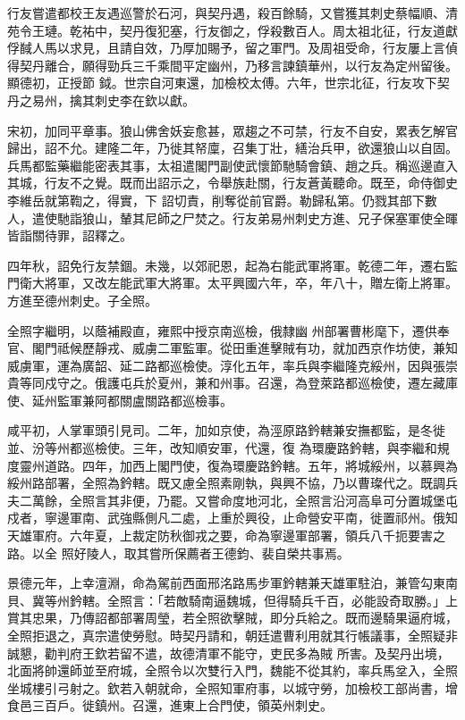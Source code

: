 \begin{pinyinscope}
 行友嘗遣都校王友遇巡警於石河，與契丹遇，殺百餘騎，又嘗獲其刺史蔡幅順、清苑令王璉。乾祐中，契丹復犯塞，行友御之，俘殺數百人。周太祖北征，行友道獻俘馘人馬以求見，且請自效，乃厚加賜予，留之軍門。及周祖受命，行友屢上言偵得契丹離合，願得勁兵三千乘間平定幽州，乃移言諫鎮華州，以行友為定州留後。顯德初，正授節
 鉞。世宗自河東還，加檢校太傅。六年，世宗北征，行友攻下契丹之易州，擒其刺史李在欽以獻。



 宋初，加同平章事。狼山佛舍妖妄愈甚，眾趨之不可禁，行友不自安，累表乞解官歸出，詔不允。建隆二年，乃徙其帑廩，召集丁壯，繕治兵甲，欲還狼山以自固。兵馬都監藥繼能密表其事，太祖遣閣門副使武懷節馳騎會鎮、趙之兵。稱巡邊直入其城，行友不之覺。既而出詔示之，令舉族赴關，行友蒼黃聽命。既至，命侍御史李維岳就第鞫之，得實，下
 詔切責，削奪從前官爵。勒歸私第。仍戮其部下數人，遣使馳詣狼山，輦其尼師之尸焚之。行友弟易州刺史方進、兄子保塞軍使全暉皆詣關待罪，詔釋之。



 四年秋，詔免行友禁錮。未幾，以郊祀恩，起為右能武軍將軍。乾德二年，遷右監門衛大將軍，又改左能武軍大將軍。太平興國六年，卒，年八十，贈左衛上將軍。方進至德州刺史。子全照。



 全照字繼明，以蔭補殿直，雍熙中授京南巡檢，俄隸幽
 州部署曹彬麾下，遷供奉官、閣門祗候歷靜戎、威虜二軍監軍。從田重進擊賊有功，就加西京作坊使，兼知威虜軍，運為廣韶、延二路都巡檢使。淳化五年，率兵與李繼隆克綏州，因與張崇貴等同戍守之。俄護屯兵於夏州，兼和州事。召還，為登萊路都巡檢使，遷左藏庫使、延州監軍兼阿都關盧關路都巡檢事。



 咸平初，人掌軍頭引見司。二年，加如京使，為涇原路鈐轄兼安撫都監，是冬徙並、汾等州都巡檢使。三年，改知順安軍，代還，復
 為環慶路鈐轄，與李繼和規度靈州道路。四年，加西上閣門使，復為環慶路鈐轄。五年，將城綏州，以慕興為綏州路部署，全照為鈐轄。既又慮全照素剛執，與興不協，乃以曹璨代之。既調兵夫二萬餘，全照言其非便，乃罷。又嘗命度地河北，全照言沿河高阜可分置城堡屯戍者，寧邊軍南、武強縣側凡二處，上重於興役，止命營安平南，徙置祁州。俄知天雄軍府。六年夏，上裁定防秋御戎之要，命為寧邊軍部署，領兵八千扼要害之路。以全
 照好陵人，取其嘗所保薦者王德鈞、裴自榮共事焉。



 景德元年，上幸澶淵，命為駕前西面邢洺路馬步軍鈐轄兼天雄軍駐泊，兼管勾東南貝、冀等州鈐轄。全照言：「若敵騎南逼魏城，但得騎兵千百，必能設奇取勝。」上賞其忠果，乃傳詔都部署周瑩，若全照欲擊賊，即分兵給之。既而邊騎果逼府城，全照拒退之，真宗遣使勞慰。時契丹請和，朝廷遣曹利用就其行帳議事，全照疑非誠懇，勸判府王欽若留不遣，故德清軍不能守，吏民多為賊
 所害。及契丹出境，北面將帥還師並至府城，全照令以次雙行入門，魏能不從其約，率兵馬坌入，全照坐城樓引弓射之。欽若入朝就命，全照知軍府事，以城守勞，加檢校工部尚書，增食邑三百戶。徙鎮州。召還，進東上合門使，領英州刺史。




\end{pinyinscope}
